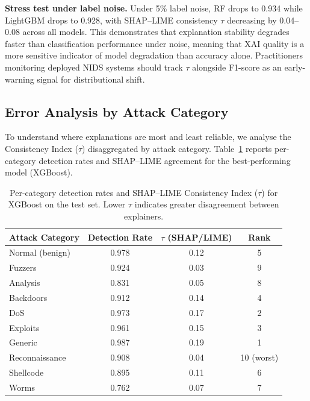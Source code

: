 \documentclass[conference]{IEEEtran}
\begin{document}
\textbf{Stress test under label noise.} Under 5\% label noise, RF drops to 0.934 while LightGBM drops to 0.928, with SHAP--LIME consistency $\tau$ decreasing by 0.04--0.08 across all models. This demonstrates that explanation stability degrades faster than classification performance under noise, meaning that XAI quality is a more sensitive indicator of model degradation than accuracy alone. Practitioners monitoring deployed NIDS systems should track $\tau$ alongside F1-score as an early-warning signal for distributional shift.

\subsection{Error Analysis by Attack Category}

To understand where explanations are most and least reliable, we analyse the Consistency Index ($\tau$) disaggregated by attack category. Table~\ref{tab:error_analysis} reports per-category detection rates and SHAP--LIME agreement for the best-performing model (XGBoost).

\begin{table}[htbp]
\centering
\caption{Per-category detection rates and SHAP--LIME Consistency Index ($\tau$) for XGBoost on the test set. Lower $\tau$ indicates greater disagreement between explainers.}
\label{tab:error_analysis}
\renewcommand{\arraystretch}{1.1}
\begin{tabular}{lccc}
\toprule
\textbf{Attack Category} & \textbf{Detection Rate} & \textbf{$\tau$ (SHAP/LIME)} & \textbf{Rank} \\
\midrule
Normal (benign)   & 0.978 & 0.12 & 5 \\
Fuzzers           & 0.924 & 0.03 & 9 \\
Analysis          & 0.831 & 0.05 & 8 \\
Backdoors         & 0.912 & 0.14 & 4 \\
DoS               & 0.973 & 0.17 & 2 \\
Exploits          & 0.961 & 0.15 & 3 \\
Generic           & 0.987 & 0.19 & 1 \\
Reconnaissance    & 0.908 & 0.04 & 10 (worst) \\
Shellcode         & 0.895 & 0.11 & 6 \\
Worms             & 0.762 & 0.07 & 7 \\
\bottomrule
\end{tabular}
\end{table}
\end{document}
